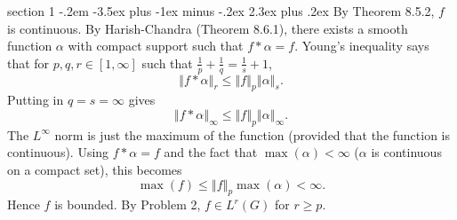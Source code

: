 \documentclass[12pt]{article}
\makeatletter
\theoremstyle{norm}
\newcommand{\rc}[1]{\frac{1}{#1}}
\newcommand{\al}[0]{\alpha}
\newcommand{\ve}[1]{\left\Vert{#1}\right\Vert}
\newcommand{\iy}[0]{\infty}
\newenvironment{problem}{\@startsection
       {section}
       {1}
       {-.2em}
       {-3.5ex plus -1ex minus -.2ex}
       {2.3ex plus .2ex}
       {\pagebreak[3]%
       \large\bf\noindent{Problem }
       }
       }
       {%
       }
\makeatother
\begin{document}
\begin{problem}{\it }
By Theorem 8.5.2, $f$ is continuous. By Harish-Chandra (Theorem 8.6.1), there exists a smooth function $\al$ with compact support such that $f*\al =f$. Young's inequality says that for $p,q,r\in [1,\iy]$ such that $\rc p+\rc q=\rc s+1$, 
\[
\ve{f*\al}_r\le \ve{f}_p\ve{\al}_{s}.
\]
Putting in $q=s=\iy$ gives
\[
\ve{f*\al}_{\iy}\le \ve{f}_p\ve{\al}_{\iy}.
\]
The $L^{\iy}$ norm is just the maximum of the function (provided that the function is continuous). Using $f*\al=f$ and the fact that $\max(\al)<\iy$ ($\al$ is continuous on a compact set), this becomes
\[
\max(f)\le \ve{f}_p\max(\al)<\iy.
\]
Hence $f$ is bounded. By Problem 2, $f\in L^r(G)$ for $r\ge p$.
\end{problem}
\end{document}
